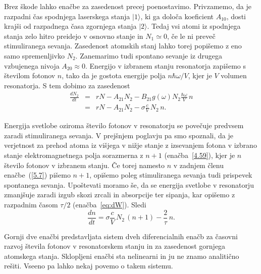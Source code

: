 Brez škode lahko enačbe za zasedenost precej poenostavimo. Privzamemo, 
da je razpadni čas spodnjega laserskega stanja $|1\rangle$, 
ki ga določa koeficient $A_{10}$, dosti krajši od razpadnega
časa zgornjega stanja $|2\rangle$. Tedaj vsi atomi iz spodnjega stanja zelo 
hitro preidejo v osnovno stanje in $N_1\simeq 0$, če le ni preveč
stimuliranega sevanja. Zasedenost atomskih stanj lahko torej popišemo z eno
samo spremenljivko $N_2$. Zanemarimo tudi spontano sevanje iz drugega vzbujenega
nivoja $A_{20} \approx 0$. Energijo v izbranem stanju resonatorja zapišemo s
številom fotonov $n$, tako da je gostota energije polja $n\hbar\omega/V$,
kjer je $V$ volumen resonatorja. S tem dobimo za zasedenost 
\begin{eqnarray}  
\frac{dN_2}{dt}&=&rN-A_{21}N_2-B_{21}g(\omega)N_2\frac{\hbar \omega}{V}\,n \label{5.7.1}\\
&=&rN-A_{21}N_2-\sigma \frac{c}{V}\, N_2\,n. 
\label{5.7}
\end{eqnarray}

Energija svetlobe oziroma število fotonov v resonatorju se povečuje predvsem 
zaradi stimuliranega sevanja. V prejšnjem poglavju pa smo spoznali, da je verjetnost 
za prehod atoma iz višjega v nižje stanje z izsevanjem fotona v izbrano 
stanje elektromagnetnega polja sorazmerna z $n+1$ (enačba~\ref{4.59}), 
kjer je $n$ število fotonov v izbranem stanju. Če torej namesto $n$ v
zadnjem členu enačbe~(\ref{5.7}) pišemo $n+1$, opišemo poleg stimuliranega
sevanja tudi prispevek spontanega sevanja. Upoštevati moramo še, da 
se energija svetlobe v resonatorju zmanjšuje zaradi izgub skozi zrcali
in absorpcije ter sipanja, kar opišemo z razpadnim časom $\tau/2$
(enačba~\ref{eq:dW}). Sledi 
\begin{equation}
\frac{dn}{dt}=\sigma \frac{c}{V}\, N_2\,(n+1)-\frac{2}{\tau}\,n.
\label{5.8}
\end{equation}

Gornji dve enačbi predstavljata sistem dveh diferencialnih enačb za 
časovni razvoj števila fotonov v resonatorskem stanju in za zasedenost 
gornjega atomskega stanja. Sklopljeni enačbi sta nelinearni in ju ne znamo 
analitično rešiti. Vseeno pa lahko nekaj povemo o takem sistemu.


